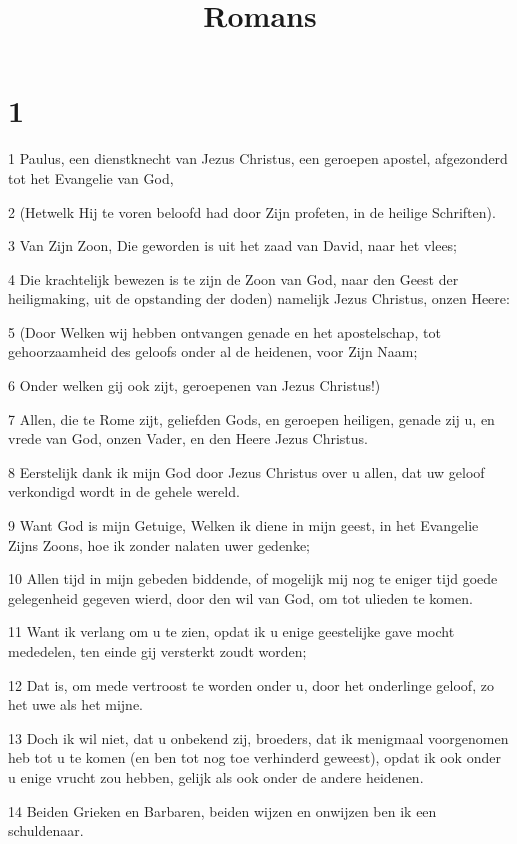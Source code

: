 

\title{Romans}



\chapter{1}

\par 1 Paulus, een dienstknecht van Jezus Christus, een geroepen apostel, afgezonderd tot het Evangelie van God,
\par 2 (Hetwelk Hij te voren beloofd had door Zijn profeten, in de heilige Schriften).
\par 3 Van Zijn Zoon, Die geworden is uit het zaad van David, naar het vlees;
\par 4 Die krachtelijk bewezen is te zijn de Zoon van God, naar den Geest der heiligmaking, uit de opstanding der doden) namelijk Jezus Christus, onzen Heere:
\par 5 (Door Welken wij hebben ontvangen genade en het apostelschap, tot gehoorzaamheid des geloofs onder al de heidenen, voor Zijn Naam;
\par 6 Onder welken gij ook zijt, geroepenen van Jezus Christus!)
\par 7 Allen, die te Rome zijt, geliefden Gods, en geroepen heiligen, genade zij u, en vrede van God, onzen Vader, en den Heere Jezus Christus.
\par 8 Eerstelijk dank ik mijn God door Jezus Christus over u allen, dat uw geloof verkondigd wordt in de gehele wereld.
\par 9 Want God is mijn Getuige, Welken ik diene in mijn geest, in het Evangelie Zijns Zoons, hoe ik zonder nalaten uwer gedenke;
\par 10 Allen tijd in mijn gebeden biddende, of mogelijk mij nog te eniger tijd goede gelegenheid gegeven wierd, door den wil van God, om tot ulieden te komen.
\par 11 Want ik verlang om u te zien, opdat ik u enige geestelijke gave mocht mededelen, ten einde gij versterkt zoudt worden;
\par 12 Dat is, om mede vertroost te worden onder u, door het onderlinge geloof, zo het uwe als het mijne.
\par 13 Doch ik wil niet, dat u onbekend zij, broeders, dat ik menigmaal voorgenomen heb tot u te komen (en ben tot nog toe verhinderd geweest), opdat ik ook onder u enige vrucht zou hebben, gelijk als ook onder de andere heidenen.
\par 14 Beiden Grieken en Barbaren, beiden wijzen en onwijzen ben ik een schuldenaar.
